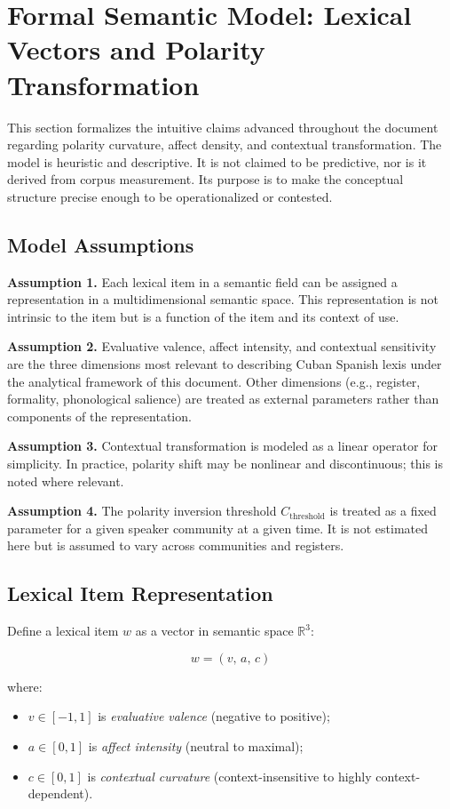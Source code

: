 \documentclass[12pt]{article}
\begin{document}
\section{Formal Semantic Model: Lexical Vectors and Polarity Transformation}

This section formalizes the intuitive claims advanced throughout the document regarding polarity curvature, affect density, and contextual transformation. The model is heuristic and descriptive. It is not claimed to be predictive, nor is it derived from corpus measurement. Its purpose is to make the conceptual structure precise enough to be operationalized or contested.

\subsection*{Model Assumptions}

\textbf{Assumption 1.} Each lexical item in a semantic field can be assigned a representation in a multidimensional semantic space. This representation is not intrinsic to the item but is a function of the item and its context of use.

\textbf{Assumption 2.} Evaluative valence, affect intensity, and contextual sensitivity are the three dimensions most relevant to describing Cuban Spanish lexis under the analytical framework of this document. Other dimensions (e.g., register, formality, phonological salience) are treated as external parameters rather than components of the representation.

\textbf{Assumption 3.} Contextual transformation is modeled as a linear operator for simplicity. In practice, polarity shift may be nonlinear and discontinuous; this is noted where relevant.

\textbf{Assumption 4.} The polarity inversion threshold $C_{\text{threshold}}$ is treated as a fixed parameter for a given speaker community at a given time. It is not estimated here but is assumed to vary across communities and registers.

\subsection*{Lexical Item Representation}

Define a lexical item $w$ as a vector in semantic space $\mathbb{R}^3$:

\[
w = (v,\, a,\, c)
\]

where:
\begin{itemize}
  \item $v \in [-1, 1]$ is \textit{evaluative valence} (negative to positive);
  \item $a \in [0, 1]$ is \textit{affect intensity} (neutral to maximal);
  \item $c \in [0, 1]$ is \textit{contextual curvature} (context-insensitive to highly context-dependent).
\end{itemize}
\end{document}
